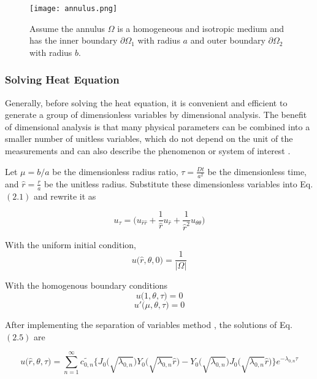 \clearpage


\begin{figure}[h!]
  \begin{center}
    \texttt{[image: annulus.png]}
    \caption{Assume the annulus $\Omega$ is a homogeneous and
      isotropic medium and has the inner boundary $\partial \Omega_1$
      with radius $a$ and outer boundary $\partial \Omega_2$ with
      radius $b$.}
  \end{center}
\end{figure}



\subsubsection{Solving Heat Equation}

Generally, before solving the heat equation, it is convenient and
efficient to generate a group of dimensionless variables by
dimensional analysis. The benefit of dimensional analysis is that many
physical parameters can be combined into a smaller number of unitless
variables, which do not depend on the unit of the measurements and can
also describe the phenomenon or system of interest
\cite{barenblatt1996scaling}.


Let $\mu = b/a$ be the dimensionless radius ratio, $\tau =
\frac{Dt}{a^2}$ be the dimensionless time, and $\hat r = \frac{r}{a}$
be the unitless radius. Substitute these dimensionless variables into
Eq.$(2.1)$ and rewrite it as

\begin{equation}
  u_\tau = \big(u_{\hat r \hat r} + \frac{1}{\hat r} u_{\hat r} + \frac{1}{\hat r ^2} u_{\theta\theta}\big)
\end{equation}

With the uniform initial condition,
$$u\big(\hat r, \theta, 0\big) = \frac{1}{|\Omega|}$$

With the homogenous boundary conditions
$$u\big(1, \theta, \tau\big) = 0$$
$$u'\big(\mu, \theta, \tau \big) = 0$$

\clearpage

After implementing the separation of variables method
\cite{crank1979mathematics}, the solutions of Eq.$(2.5)$ are

\begin{equation}
  u\big(\hat r, \theta, \tau \big) = \sum_{n=1}^{\infty}
  \tilde{c_{0,n}} \bigg\{J_0\big(\sqrt{\lambda_{0,n}}\big)
  Y_0\big(\sqrt{\lambda_{0,n}} \hat r\big) -
  Y_0\big(\sqrt{\lambda_{0,n}}\big) J_0\big(\sqrt{\lambda_{0,n}} \hat
  r\big)\bigg\} e^{-\lambda_{0,n}\tau}
\end{equation}

